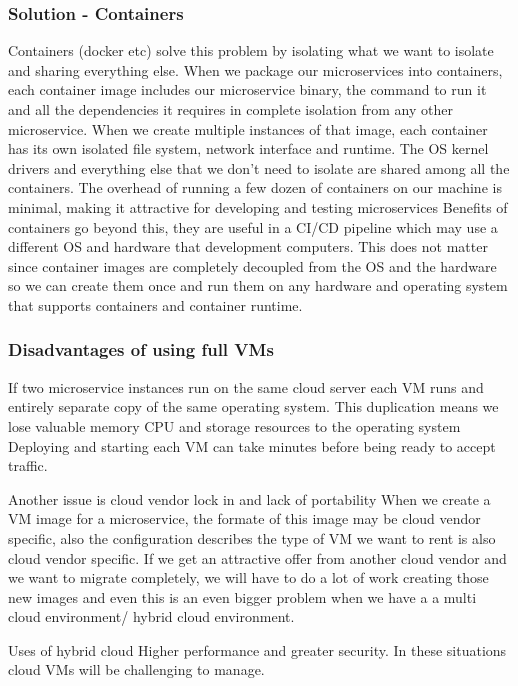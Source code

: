 \documentclass[a4paper, 11pt]{book}
\begin{document}
    \subsubsection{Solution - Containers}
    Containers (docker etc) solve this problem by isolating what we want to isolate and sharing everything else.
    When we package our microservices into containers, each container image includes our microservice binary, the command to run it and all the dependencies it requires in complete isolation from any other microservice.
    When we create multiple instances of that image, each container has its own isolated file system, network interface and runtime.
    The OS kernel drivers and everything else that we don't need to isolate are shared among all the containers.
    The overhead of running a few dozen of containers on our machine is minimal, making it attractive for developing and testing microservices
    Benefits of containers go beyond this, they are useful in a CI/CD pipeline which may use a different OS and hardware that development computers.
    This does not matter since container images are completely decoupled from the OS and the hardware so we can create them once and run them on any hardware and operating system that supports containers and container runtime.

    \subsubsection{Disadvantages of using full VMs}
    If two microservice instances run on the same cloud server each VM runs and entirely separate copy of the same operating system.
    This duplication means we lose valuable memory CPU and storage resources to the operating system
    Deploying and starting each VM can take minutes before being ready to accept traffic.

    Another issue is cloud vendor lock in and lack of portability
    When we create a VM image for a microservice,  the formate of this image may be cloud vendor specific, also the configuration describes the type of VM we want to rent is also cloud vendor specific.
    If we get an attractive offer from another cloud vendor and we want to migrate completely, we will have to do a lot of work creating those new images and even this is an even bigger problem when we have a a multi cloud environment/ hybrid cloud environment.

    Uses of hybrid cloud
    Higher performance and greater security.
    In these situations cloud VMs will be challenging to manage.
\end{document}
